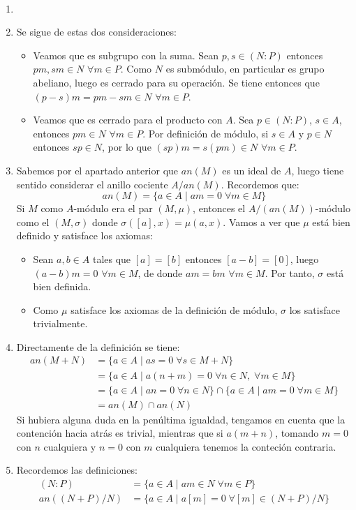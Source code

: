 \documentclass[twoside]{article}
\begin{document}
\begin{solucion}\
\begin{enumerate}
\item[]
\item Se sigue de estas dos consideraciones:
\begin{itemize}
\item Veamos que es subgrupo con la suma. Sean $p,s\in (N:P)$ entonces $pm,sm\in N$ $\forall m \in P$. Como $N$ es submódulo, en particular es grupo abeliano, luego es cerrado para su operación. Se tiene entonces que $(p-s)m=pm-sm \in N$ $\forall m\in P$. 
\item Veamos que es cerrado para el producto con $A$. Sea $p\in (N:P)$, $s\in A$, entonces $pm\in N$ $\forall m\in P$. Por definición de módulo, si $s\in A$ y $p\in N$ entonces $sp\in N$, por lo que $(sp)m=s(pm)\in N$ $\forall m \in P$.
\end{itemize}
\newpage
\item Sabemos por el apartado anterior que $an(M)$ es un ideal de $A$, luego tiene sentido considerar el anillo cociente $A/an(M)$. Recordemos que:
$$
an(M) = \{a \in A\mid am = 0 \; \forall m\in M\}
$$
Si $M$ como $A$-módulo era el par $(M,\mu)$, entonces el $A/(an(M))$-módulo como el $(M,\sigma)$ donde $\sigma([a],x)=\mu(a,x)$. Vamos a ver que $\mu$ está bien definido y satisface los axiomas:
\begin{itemize}
\item Sean $a,b\in A$ tales que $[a]=[b]$ entonces $[a-b]=[0]$, luego $(a-b
)m=0$ $\forall m \in M$, de donde $am=bm$ $\forall m\in M$. Por tanto, $\sigma$ está bien definida.
\item Como $\mu$ satisface los axiomas de la definición de módulo, $\sigma$ los satisface trivialmente.
\end{itemize}
\item Directamente de la definición se tiene:
\begin{align*}
an(M+N) &= \{a \in A\mid as = 0 \; \forall s\in M+N\} \\
&= \{a \in A\mid a(n+m) = 0 \; \forall n\in N,\; \forall m\in M\}\\
&= \{a \in A\mid an= 0 \; \forall n\in N\}\cap \{a \in A\mid am = 0 \; \forall m\in M\}\\
&=an(M)\cap an(N)
\end{align*}
Si hubiera alguna duda en la penúltima igualdad, tengamos en cuenta que la contención hacia atrás es trivial, mientras que si $a(m+n)$, tomando $m=0$ con $n$ cualquiera y $n=0$ con $m$ cualquiera tenemos la conteción contraria.
\item Recordemos las definiciones:
\begin{align*}
(N:P) &= \{a\in A\mid am\in N \;\forall m \in P\}\\
an((N+P)/N)&= \{a \in A\mid a[m] = 0 \; \forall [m]\in (N+P)/N\}
\end{align*}

\end{enumerate}

\end{solucion}
\end{document}
